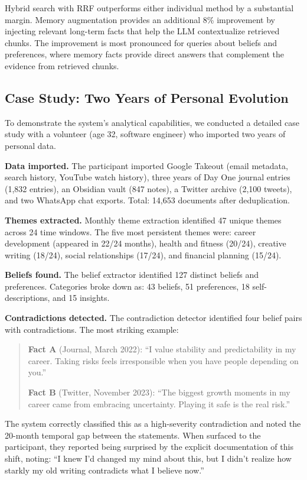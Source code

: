 \documentclass[manuscript,review]{acmart}
\begin{document}
Hybrid search with RRF outperforms either individual method by a substantial margin.
Memory augmentation provides an additional 8\% improvement by injecting relevant long-term facts that help the LLM contextualize retrieved chunks.
The improvement is most pronounced for queries about beliefs and preferences, where memory facts provide direct answers that complement the evidence from retrieved chunks.

\subsection{Case Study: Two Years of Personal Evolution}
\label{sec:case-study}

To demonstrate the system's analytical capabilities, we conducted a detailed case study with a volunteer (age 32, software engineer) who imported two years of personal data.

\textbf{Data imported.}
The participant imported Google Takeout (email metadata, search history, YouTube watch history), three years of Day One journal entries (1,832 entries), an Obsidian vault (847 notes), a Twitter archive (2,100 tweets), and two WhatsApp chat exports.
Total: 14,653 documents after deduplication.

\textbf{Themes extracted.}
Monthly theme extraction identified 47 unique themes across 24 time windows.
The five most persistent themes were: career development (appeared in 22/24 months), health and fitness (20/24), creative writing (18/24), social relationships (17/24), and financial planning (15/24).

\textbf{Beliefs found.}
The belief extractor identified 127 distinct beliefs and preferences.
Categories broke down as: 43 beliefs, 51 preferences, 18 self-descriptions, and 15 insights.

\textbf{Contradictions detected.}
The contradiction detector identified four belief pairs with contradictions. The most striking example:

\begin{quote}
\textbf{Fact A} (Journal, March 2022): ``I value stability and predictability in my career. Taking risks feels irresponsible when you have people depending on you.''

\textbf{Fact B} (Twitter, November 2023): ``The biggest growth moments in my career came from embracing uncertainty. Playing it safe is the real risk.''
\end{quote}

The system correctly classified this as a high-severity contradiction and noted the 20-month temporal gap between the statements.
When surfaced to the participant, they reported being surprised by the explicit documentation of this shift, noting: ``I knew I'd changed my mind about this, but I didn't realize how starkly my old writing contradicts what I believe now.''
\end{document}
